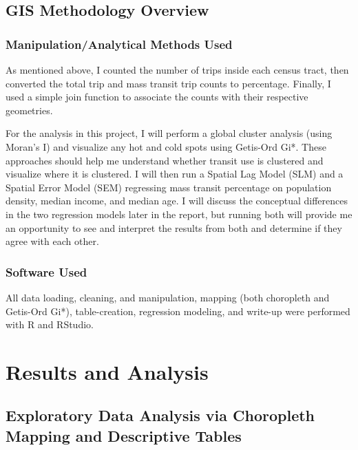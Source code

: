 \documentclass[
]{article}
\begin{document}
\subsection{GIS Methodology Overview}\label{gis-methodology-overview}

\subsubsection{Manipulation/Analytical Methods
Used}\label{manipulationanalytical-methods-used}

As mentioned above, I counted the number of trips inside each census
tract, then converted the total trip and mass transit trip counts to
percentage. Finally, I used a simple join function to associate the
counts with their respective geometries.

For the analysis in this project, I will perform a global cluster
analysis (using Moran's I) and visualize any hot and cold spots using
Getis-Ord Gi*. These approaches should help me understand whether
transit use is clustered and visualize where it is clustered. I will
then run a Spatial Lag Model (SLM) and a Spatial Error Model (SEM)
regressing mass transit percentage on population density, median income,
and median age. I will discuss the conceptual differences in the two
regression models later in the report, but running both will provide me
an opportunity to see and interpret the results from both and determine
if they agree with each other.

\subsubsection{Software Used}\label{software-used}

All data loading, cleaning, and manipulation, mapping (both choropleth
and Getis-Ord Gi*), table-creation, regression modeling, and write-up
were performed with R and RStudio.

\newpage

\section{Results and Analysis}\label{results-and-analysis}

\subsection{Exploratory Data Analysis via Choropleth Mapping and
Descriptive
Tables}\label{exploratory-data-analysis-via-choropleth-mapping-and-descriptive-tables}
\end{document}
